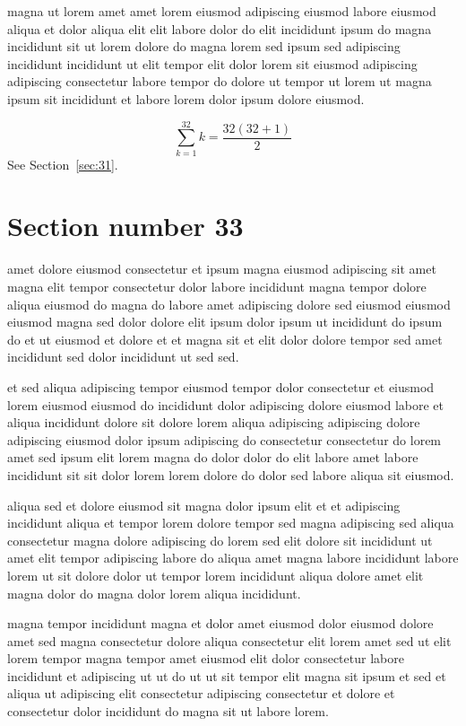 \documentclass{article}
\begin{document}
magna ut lorem amet amet lorem eiusmod adipiscing eiusmod labore eiusmod aliqua et dolor aliqua elit elit labore dolor do elit incididunt ipsum do magna incididunt sit ut lorem dolore do magna lorem sed ipsum sed adipiscing incididunt incididunt ut elit tempor elit dolor lorem sit eiusmod adipiscing adipiscing consectetur labore tempor do dolore ut tempor ut lorem ut magna ipsum sit incididunt et labore lorem dolor ipsum dolore eiusmod.

\begin{equation} \sum_{k=1}^{32} k = \frac{32(32+1)}{2} \end{equation}
See Section~\ref{sec:31}.

\section{Section number 33}\label{sec:33}
amet dolore eiusmod consectetur et ipsum magna eiusmod adipiscing sit amet magna elit tempor consectetur dolor labore incididunt magna tempor dolore aliqua eiusmod do magna do labore amet adipiscing dolore sed eiusmod eiusmod eiusmod magna sed dolor dolore elit ipsum dolor ipsum ut incididunt do ipsum do et ut eiusmod et dolore et et magna sit et elit dolor dolore tempor sed amet incididunt sed dolor incididunt ut sed sed.

et sed aliqua adipiscing tempor eiusmod tempor dolor consectetur et eiusmod lorem eiusmod eiusmod do incididunt dolor adipiscing dolore eiusmod labore et aliqua incididunt dolore sit dolore lorem aliqua adipiscing adipiscing dolore adipiscing eiusmod dolor ipsum adipiscing do consectetur consectetur do lorem amet sed ipsum elit lorem magna do dolor dolor do elit labore amet labore incididunt sit sit dolor lorem lorem dolore do dolor sed labore aliqua sit eiusmod.

aliqua sed et dolore eiusmod sit magna dolor ipsum elit et et adipiscing incididunt aliqua et tempor lorem dolore tempor sed magna adipiscing sed aliqua consectetur magna dolore adipiscing do lorem sed elit dolore sit incididunt ut amet elit tempor adipiscing labore do aliqua amet magna labore incididunt labore lorem ut sit dolore dolor ut tempor lorem incididunt aliqua dolore amet elit magna dolor do magna dolor lorem aliqua incididunt.

magna tempor incididunt magna et dolor amet eiusmod dolor eiusmod dolore amet sed magna consectetur dolore aliqua consectetur elit lorem amet sed ut elit lorem tempor magna tempor amet eiusmod elit dolor consectetur labore incididunt et adipiscing ut ut do ut ut sit tempor elit magna sit ipsum et sed et aliqua ut adipiscing elit consectetur adipiscing consectetur et dolore et consectetur dolor incididunt do magna sit ut labore lorem.
\end{document}

